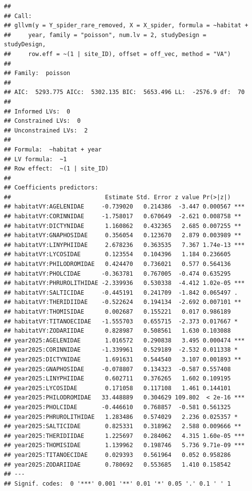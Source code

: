 \documentclass[
]{article}
\begin{document}
\begin{verbatim}
## 
## Call:
## gllvm(y = Y_spider_rare_removed, X = X_spider, formula = ~habitat + 
##     year, family = "poisson", num.lv = 2, studyDesign = studyDesign, 
##     row.eff = ~(1 | site_ID), offset = off_vec, method = "VA")
## 
## Family:  poisson 
## 
## AIC:  5293.775 AICc:  5302.135 BIC:  5653.496 LL:  -2576.9 df:  70 
## 
## Informed LVs:  0 
## Constrained LVs:  0 
## Unconstrained LVs:  2 
## 
## Formula:  ~habitat + year 
## LV formula:  ~1 
## Row effect:  ~(1 | site_ID) 
## 
## Coefficients predictors:
##                           Estimate Std. Error z value Pr(>|z|)    
## habitatVY:AGELENIDAE     -0.739020   0.214386  -3.447 0.000567 ***
## habitatVY:CORINNIDAE     -1.758017   0.670649  -2.621 0.008758 ** 
## habitatVY:DICTYNIDAE      1.160862   0.432365   2.685 0.007255 ** 
## habitatVY:GNAPHOSIDAE     0.356054   0.123670   2.879 0.003989 ** 
## habitatVY:LINYPHIIDAE     2.678236   0.363535   7.367 1.74e-13 ***
## habitatVY:LYCOSIDAE       0.123554   0.104396   1.184 0.236605    
## habitatVY:PHILODROMIDAE   0.424470   0.736021   0.577 0.564136    
## habitatVY:PHOLCIDAE      -0.363781   0.767005  -0.474 0.635295    
## habitatVY:PHRUROLITHIDAE -2.339936   0.530338  -4.412 1.02e-05 ***
## habitatVY:SALTICIDAE     -0.445191   0.241709  -1.842 0.065497 .  
## habitatVY:THERIDIIDAE    -0.522624   0.194134  -2.692 0.007101 ** 
## habitatVY:THOMISIDAE      0.002687   0.155221   0.017 0.986189    
## habitatVY:TITANOECIDAE   -1.555703   0.655715  -2.373 0.017667 *  
## habitatVY:ZODARIIDAE      0.828987   0.508561   1.630 0.103088    
## year2025:AGELENIDAE       1.016572   0.290838   3.495 0.000474 ***
## year2025:CORINNIDAE      -1.339961   0.529189  -2.532 0.011338 *  
## year2025:DICTYNIDAE       1.691631   0.544540   3.107 0.001893 ** 
## year2025:GNAPHOSIDAE     -0.078807   0.134323  -0.587 0.557408    
## year2025:LINYPHIIDAE      0.602711   0.376265   1.602 0.109195    
## year2025:LYCOSIDAE        0.171058   0.117108   1.461 0.144101    
## year2025:PHILODROMIDAE   33.448889   0.304629 109.802  < 2e-16 ***
## year2025:PHOLCIDAE       -0.446610   0.768857  -0.581 0.561325    
## year2025:PHRUROLITHIDAE   1.283486   0.574029   2.236 0.025357 *  
## year2025:SALTICIDAE       0.825331   0.318962   2.588 0.009666 ** 
## year2025:THERIDIIDAE      1.225697   0.284062   4.315 1.60e-05 ***
## year2025:THOMISIDAE       1.139962   0.198746   5.736 9.71e-09 ***
## year2025:TITANOECIDAE     0.029393   0.561964   0.052 0.958286    
## year2025:ZODARIIDAE       0.780692   0.553685   1.410 0.158542    
## ---
## Signif. codes:  0 '***' 0.001 '**' 0.01 '*' 0.05 '.' 0.1 ' ' 1
\end{verbatim}
\end{document}
